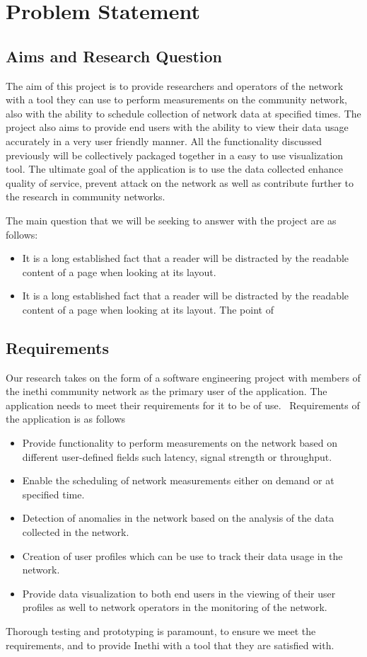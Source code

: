 \section{Problem Statement}
\subsection{Aims and Research Question}
The aim of this project is to provide researchers and operators of the network with a tool they can use to perform measurements on the community network, also with the ability to schedule collection of network data at specified times. The project also aims to provide end users with the ability to view their data usage accurately in a very user friendly manner. All the functionality discussed previously will be collectively packaged together in a easy to use visualization tool. The ultimate goal of the application is to use the data collected enhance quality of service, prevent attack on the network as well as contribute further to the research in community networks.

The main question that we will be seeking to answer with the project are as follows:
\begin{itemize}
	\item It is a long established fact that a reader will be distracted by the readable content of a page when looking at its layout. 
	\item It is a long established fact that a reader will be distracted by the readable content of a page when looking at its layout. The point of 
\end{itemize}

\subsection{Requirements}
Our research takes on the form of a software engineering project with members of the inethi community network as the primary user of the application. The application needs to meet their requirements for it to be of use.
\
Requirements of the application is as follows 
\begin{itemize}
	\item Provide functionality to perform measurements on the network based on different user-defined fields such latency, signal strength or throughput.
	
	\item Enable the scheduling of network measurements either on demand or at specified time.  
	
	\item Detection of anomalies in the network based on the analysis of the data collected in the network.
	
	\item Creation of user profiles which can be use to track their data usage in the network. 
	
	\item Provide data visualization to both end users in the viewing of their user profiles as well to network operators in the monitoring of the network.
\end{itemize}
Thorough testing and prototyping is paramount, to ensure we meet the requirements, and to provide Inethi with a tool that they are satisfied with.
